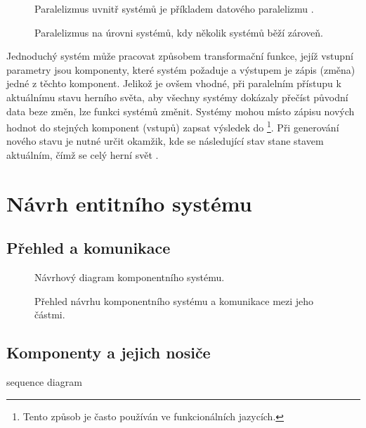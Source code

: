 \begin{figure}
	\caption{Paralelizmus uvnitř systémů je příkladem datového paralelizmu \cite{KindsOfParallelism}.}
	\label{Fig:PARData}
\end{figure}

\begin{figure}
	\caption{Paralelizmus na úrovni systémů, kdy několik systémů běží zároveň.}
	\label{Fig:PARSystem}
\end{figure}

Jednoduchý systém může pracovat způsobem transformační funkce, jejíž vstupní parametry jsou komponenty, které systém požaduje a výstupem je zápis (změna) jedné z těchto komponent. Jelikož je ovšem vhodné, při paralelním přístupu k aktuálnímu stavu herního světa, aby všechny systémy dokázaly přečíst původní data beze změn, lze funkci systémů změnit. Systémy mohou místo zápisu nových hodnot do stejných komponent (vstupů) zapsat výsledek do  \cite{FrontierThreads} \footnote{Tento způsob je často používán ve funkcionálních jazycích.}. Při generování nového stavu je nutné určit okamžik, kde se následující stav stane stavem aktuálním, čímž se celý herní svět .

\chapter{Návrh entitního systému}

\section{Přehled a komunikace}
\begin{figure}[H]
	\caption{Návrhový diagram komponentního systému. }
\end{figure}
\blind[1]
\begin{figure}[H]
	\caption{Přehled návrhu komponentního systému a komunikace mezi jeho částmi. }
\end{figure}
\blind[3]

\section{Komponenty a jejich nosiče}
\blind[4]
sequence diagram

